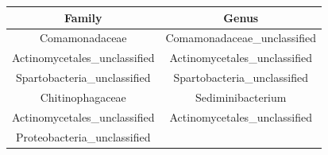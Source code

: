 \documentclass[]{article}
\begin{document}
\begin{longtable}[]{@{}cc@{}}
\toprule
\begin{minipage}[b]{0.44\columnwidth}\centering\strut
Family\strut
\end{minipage} & \begin{minipage}[b]{0.44\columnwidth}\centering\strut
Genus\strut
\end{minipage}\tabularnewline
\midrule
\endhead
\begin{minipage}[t]{0.44\columnwidth}\centering\strut
Comamonadaceae\strut
\end{minipage} & \begin{minipage}[t]{0.44\columnwidth}\centering\strut
Comamonadaceae\_unclassified\strut
\end{minipage}\tabularnewline
\begin{minipage}[t]{0.44\columnwidth}\centering\strut
Actinomycetales\_unclassified\strut
\end{minipage} & \begin{minipage}[t]{0.44\columnwidth}\centering\strut
Actinomycetales\_unclassified\strut
\end{minipage}\tabularnewline
\begin{minipage}[t]{0.44\columnwidth}\centering\strut
Spartobacteria\_unclassified\strut
\end{minipage} & \begin{minipage}[t]{0.44\columnwidth}\centering\strut
Spartobacteria\_unclassified\strut
\end{minipage}\tabularnewline
\begin{minipage}[t]{0.44\columnwidth}\centering\strut
Chitinophagaceae\strut
\end{minipage} & \begin{minipage}[t]{0.44\columnwidth}\centering\strut
Sediminibacterium\strut
\end{minipage}\tabularnewline
\begin{minipage}[t]{0.44\columnwidth}\centering\strut
Actinomycetales\_unclassified\strut
\end{minipage} & \begin{minipage}[t]{0.44\columnwidth}\centering\strut
Actinomycetales\_unclassified\strut
\end{minipage}\tabularnewline
\begin{minipage}[t]{0.44\columnwidth}\centering\strut
Proteobacteria\_unclassified\strut
\end{minipage} & \begin{minipage}[t]{0.44\columnwidth}\centering\strut

\end{minipage}
\end{longtable}
\end{document}
